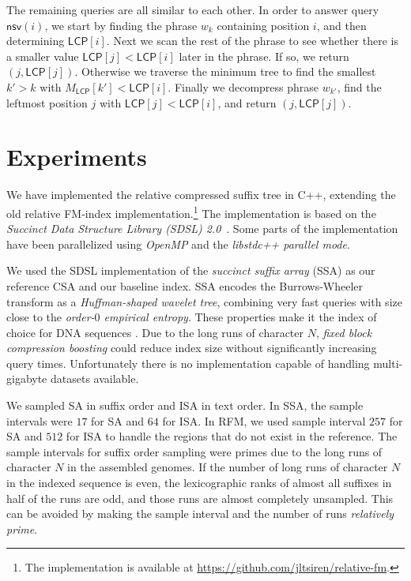 \documentclass[a4paper,11pt]{llncs}
\newcommand{\SA}{\textsf{SA}}
\newcommand{\ISA}{\textsf{ISA}}
\newcommand{\CSA}{\textsf{CSA}}
\newcommand{\SSA}{\textsf{SSA}}
\newcommand{\RFM}{\textsf{RFM}}
\newcommand{\mLCP}{\ensuremath{\mathsf{LCP}}}
\newcommand{\mnsv}{\ensuremath{\mathsf{nsv}}}
\begin{document}
The remaining queries are all similar to each other. In order to answer query $\mnsv(i)$, we start by finding the phrase $w_{k}$ containing position $i$, and then determining $\mLCP[i]$. Next we scan the rest of the phrase to see whether there is a smaller value $\mLCP[j] < \mLCP[i]$ later in the phrase. If so, we return $(j,\mLCP[j])$. Otherwise we traverse the minimum tree to find the smallest $k' > k$ with $M_{\mLCP}[k'] < \mLCP[i]$. Finally we decompress phrase $w_{k'}$, find the leftmost position $j$ with $\mLCP[j] < \mLCP[i]$, and return $(j,\mLCP[j])$.


\section{Experiments}

We have implemented the relative compressed suffix tree in C++, extending the old relative FM-index implementation.\footnote{The implementation is available at \url{https://github.com/jltsiren/relative-fm}.} The implementation is based on the \emph{Succinct Data Structure Library (SDSL) 2.0}~\cite{Gog2014b}. Some parts of the implementation have been parallelized using \emph{OpenMP} and the \emph{libstdc++ parallel mode}.

We used the SDSL implementation of the \emph{succinct suffix array} (\SSA{}) \cite{Ferragina2007a,Maekinen2005} as our reference \CSA{} and our baseline index. \SSA{} encodes the Burrows-Wheeler transform as a \emph{Huffman-shaped wavelet tree}, combining very fast queries with size close to the \emph{order\nobreakdash-$0$ empirical entropy}. These properties make it the index of choice for DNA sequences \cite{Ferragina2009a}. Due to the long runs of character $N$, \emph{fixed block compression boosting} \cite{Kaerkkaeinen2011} could reduce index size without significantly increasing query times. Unfortunately there is no implementation capable of handling multi-gigabyte datasets available.

We sampled \SA{} in suffix order and \ISA{} in text order. In \SSA, the sample intervals were $17$ for \SA{} and $64$ for \ISA. In \RFM, we used sample interval $257$ for \SA{} and $512$ for \ISA{} to handle the regions that do not exist in the reference. The sample intervals for suffix order sampling were primes due to the long runs of character $N$ in the assembled genomes. If the number of long runs of character $N$ in the indexed sequence is even, the lexicographic ranks of almost all suffixes in half of the runs are odd, and those runs are almost completely unsampled. This can be avoided by making the sample interval and the number of runs \emph{relatively prime}.
\end{document}
